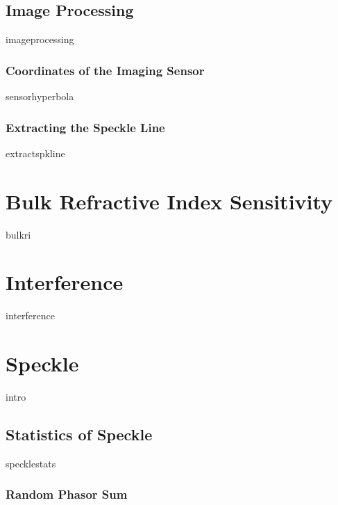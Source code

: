 \documentclass[a4paper,titlepage,onecolumn]{report}
\begin{document}
 \section{Image Processing}
 {imageprocessing}
  \subsection{Coordinates of the Imaging Sensor}
  {sensorhyperbola}
  \subsection{Extracting the Speckle Line}
  {extractspkline}

\chapter{Bulk Refractive Index Sensitivity} \label{ch:bulkri}
{bulkri}
\chapter{Interference} \label{ch:interference}
{interference}

\chapter{Speckle} \label{ch:speckle}
{intro}
 \section{Statistics of Speckle}
	{specklestats}
  \subsection{Random Phasor Sum}
\end{document}
